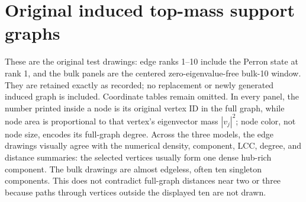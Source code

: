 \documentclass[10pt,letterpaper]{article}
\begin{document}
\section{Original induced top-mass support graphs}
These are the original test drawings: edge ranks 1--10 include the Perron state at rank 1, and the bulk panels are the centered zero-eigenvalue-free bulk-10 window. They are retained exactly as recorded; no replacement or newly generated induced graph is included. Coordinate tables remain omitted. In every panel, the number printed inside a node is its original vertex ID in the full graph, while node area is proportional to that vertex's eigenvector mass $|v_j|^2$; node color, not node size, encodes its full-graph degree.
Across the three models, the edge drawings visually agree with the numerical density, component, LCC, degree, and distance summaries: the selected vertices usually form one dense hub-rich component. The bulk drawings are almost edgeless, often ten singleton components. This does not contradict full-graph distances near two or three because paths through vertices outside the displayed ten are not drawn.
\end{document}
